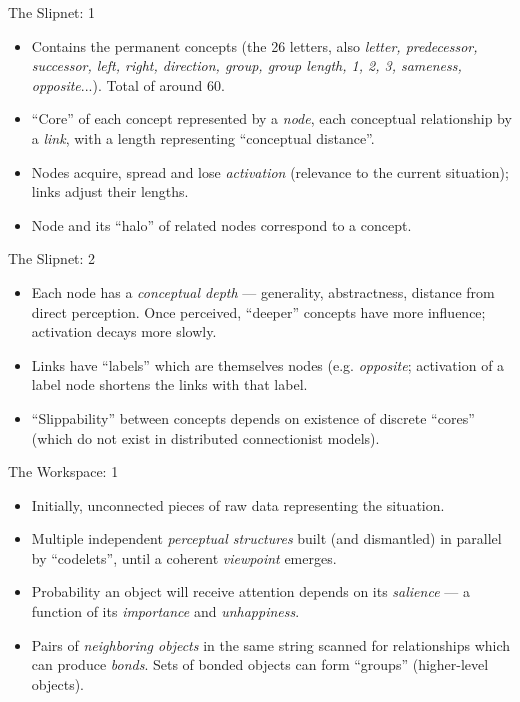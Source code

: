 \documentclass{article}
\begin{document}
\begin{slide}
{\Large The Slipnet: 1}
\begin{itemize}
\item Contains the permanent concepts (the 26 letters, also {\em
letter, predecessor, successor, left, right, direction, group, group
length, 1, 2, 3, sameness, opposite}...). Total of around 60.
\item ``Core'' of each concept represented by a {\em node}, each
conceptual relationship
by a {\em link}, with a length representing ``conceptual distance''.
\item Nodes acquire, spread and lose {\em activation} (relevance to
the current situation); links adjust their lengths.
\item Node and its ``halo'' of related nodes correspond to a concept.
\end{itemize}
\end{slide}

\begin{slide}
{\Large The Slipnet: 2}
\begin{itemize}
\item Each node has a {\em conceptual depth} --- generality,
abstractness, distance from direct perception. Once perceived,
``deeper'' concepts have more influence; activation decays more
slowly.
\item Links have ``labels'' which are themselves nodes (e.g. {\em
opposite}; activation of a label node shortens the links with that
label.
\item ``Slippability'' between concepts depends on existence of
discrete ``cores''
(which do not exist in distributed connectionist models).
\end{itemize}
\end{slide}

\begin{slide}
{\Large The Workspace: 1}
\begin{itemize}
\item Initially, unconnected pieces of raw data representing the
situation.
\item Multiple independent {\em perceptual structures} built (and
dismantled) in parallel by ``codelets'', until a coherent {\em
viewpoint} emerges.
\item Probability an object will receive attention depends on its {\em
salience} --- a function of its {\em importance} and {\em
unhappiness}.
\item Pairs of {\em neighboring objects} in the same string
scanned for relationships which can produce {\em bonds}. Sets of
bonded objects can form ``groups'' (higher-level objects).
\end{itemize}
\end{slide}
\end{document}

